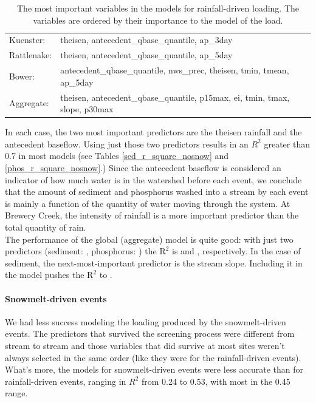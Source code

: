 \documentclass[10pt]{article}
\begin{document}
\begin{table}[h!]
\begin{center}
\begin{tabular}{ll}
        \hspace{5mm} Kuenster: & theisen, antecedent\_qbase\_quantile, ap\_3day\\
        \hspace{5mm} Rattlenake: & theisen, antecedent\_qbase\_quantile, ap\_5day\\
        \hspace{5mm} Bower: & antecedent\_qbase\_quantile, nws\_prec, theisen, tmin, tmean, ap\_5day\\
        \hspace{5mm} Aggregate: & theisen, antecedent\_qbase\_quantile, p15max, ei, tmin, tmax, slope, p30max\\
    \end{tabular}
    \caption{The most important variables in the models for rainfall-driven loading. The variables are ordered by their importance to the model of the load. \label{nosnow_predictor_list}}
    \end{center}
\end{table}

In each case, the two most important predictors are the theisen rainfall and the antecedent baseflow. Using just those two predictors results in an $R^2$ greater than 0.7 in most models (see Tables \ref{sed_r_square_nosnow} and \ref{phos_r_square_nosnow}.) Since the antecedent baseflow is considered an indicator of how much water is in the watershed before each event, we conclude that the amount of sediment and phosphorus washed into a stream by each event is mainly a function of the quantity of water moving through the system. At Brewery Creek, the intensity of rainfall is a more important predictor than the total quantity of rain.\\

The performance of the global (aggregate) model is quite good: with just two predictors (sediment: , phosphorus: ) the $\text{R}^2$ is  and , respectively. In the case of sediment, the next-most-important predictor is the stream slope. Including it in the model pushes the $\text{R}^2$ to .\\

\paragraph{Snowmelt-driven events} We had less success modeling the loading produced by the snowmelt-driven events. The predictors that survived the screening process were different from stream to stream and those variables that did survive at most sites weren't always selected in the same order (like they were for the rainfall-driven events). What's more, the models for snowmelt-driven events were less accurate than for rainfall-driven events, ranging in $R^2$ from 0.24 to 0.53, with most in the 0.45 range.\\
\end{document}
